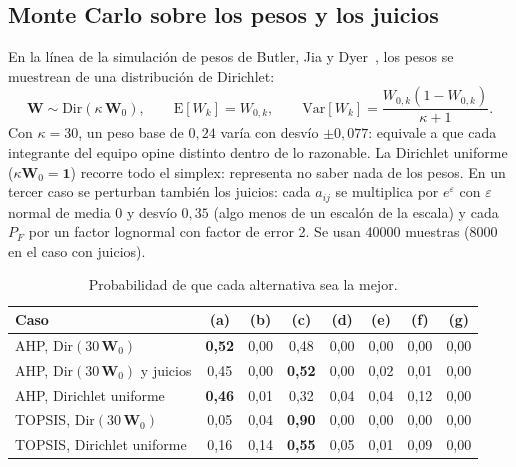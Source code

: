 \subsection{Monte Carlo sobre los pesos y los juicios}
En la línea de la simulación de pesos de Butler, Jia y Dyer~\cite{decision-butler1997},
los pesos se muestrean de una distribución de Dirichlet:
\begin{equation}
  \mathbf{W}\sim\mathrm{Dir}(\kappa\,\mathbf{W}_0),\qquad
  \mathrm{E}[W_k]=W_{0,k},\qquad
  \mathrm{Var}[W_k]=\frac{W_{0,k}(1-W_{0,k})}{\kappa+1}.
  \label{eq:decision-dir}
\end{equation}
Con $\kappa=30$, un peso base de $0{,}24$ varía con desvío $\pm0{,}077$: equivale a que
cada integrante del equipo opine distinto dentro de lo razonable. La Dirichlet uniforme
($\kappa\mathbf{W}_0=\mathbf{1}$) recorre todo el simplex: representa no saber nada de
los pesos. En un tercer caso se perturban también los juicios: cada $a_{ij}$ se multiplica
por $e^{\varepsilon}$ con $\varepsilon$ normal de media 0 y desvío $0{,}35$ (algo menos de un
escalón de la escala) y cada $P_F$ por un factor lognormal con factor de error 2. Se usan
\num{40000} muestras (\num{8000} en el caso con juicios).

\begin{table}[H]
\centering\small
\caption{Probabilidad de que cada alternativa sea la mejor.}
\label{tab:decision-pmejor}
\begin{tabular}{@{}l*{7}{c}@{}}
\toprule
Caso & (a) & (b) & (c) & (d) & (e) & (f) & (g)\\\midrule
AHP, $\mathrm{Dir}(30\,\mathbf{W}_0)$           & \textbf{0,52} & 0,00 & 0,48 & 0,00 & 0,00 & 0,00 & 0,00\\
AHP, $\mathrm{Dir}(30\,\mathbf{W}_0)$ y juicios & 0,45 & 0,00 & \textbf{0,52} & 0,00 & 0,02 & 0,01 & 0,00\\
AHP, Dirichlet uniforme                         & \textbf{0,46} & 0,01 & 0,32 & 0,04 & 0,04 & 0,12 & 0,00\\
TOPSIS, $\mathrm{Dir}(30\,\mathbf{W}_0)$        & 0,05 & 0,04 & \textbf{0,90} & 0,00 & 0,00 & 0,00 & 0,00\\
TOPSIS, Dirichlet uniforme                      & 0,16 & 0,14 & \textbf{0,55} & 0,05 & 0,01 & 0,09 & 0,00\\
\bottomrule
\end{tabular}
\end{table}

